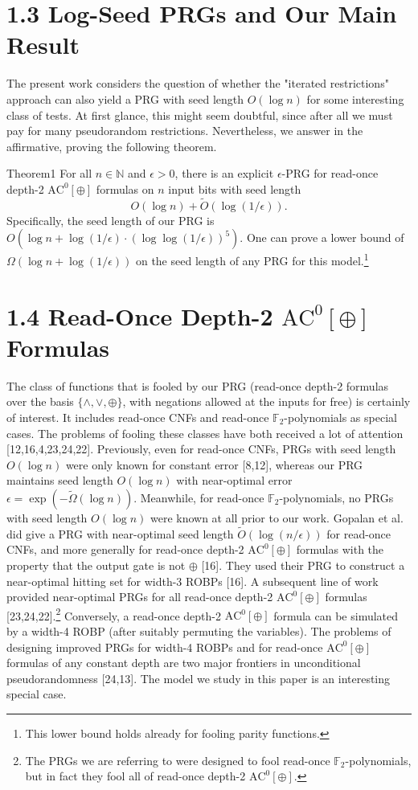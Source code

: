 \section*{1.3 Log-Seed PRGs and Our Main Result}
The present work considers the question of whether the "iterated restrictions" approach can also yield a PRG with seed length $O(\log n)$ for some interesting class of tests. At first glance, this might seem doubtful, since after all we must pay for many pseudorandom restrictions. Nevertheless, we answer in the affirmative, proving the following theorem.
\begin{authorclaim}{Theorem1}
For all $n\in\mathbb N$ and $\epsilon>0$, there is an explicit $\epsilon$-PRG for read-once depth-2 $\mathrm{AC}^0[\oplus]$ formulas on $n$ input bits with seed length
\[
O(\log n)+\widetilde O(\log(1/\epsilon)).
\]
Specifically, the seed length of our PRG is $O(\log n+\log(1/\epsilon)\cdot(\log\log(1/\epsilon))^5)$. One can prove a lower bound of $\Omega(\log n+\log(1/\epsilon))$ on the seed length of any PRG for this model.\footnote{This lower bound holds already for fooling parity functions.}
\end{authorclaim}
\section*{1.4 Read-Once Depth-2 $\mathrm{AC}^0[\oplus]$ Formulas}
The class of functions that is fooled by our PRG (read-once depth-2 formulas over the basis $\{\wedge,\vee,\oplus\}$, with negations allowed at the inputs for free) is certainly of interest. It includes read-once CNFs and read-once $\mathbb F_2$-polynomials as special cases. The problems of fooling these classes have both received a lot of attention [12,16,4,23,24,22]. Previously, even for read-once CNFs, PRGs with seed length $O(\log n)$ were only known for constant error [8,12], whereas our PRG maintains seed length $O(\log n)$ with near-optimal error $\epsilon=\exp(-\widetilde\Omega(\log n))$. Meanwhile, for read-once $\mathbb F_2$-polynomials, no PRGs with seed length $O(\log n)$ were known at all prior to our work.
Gopalan et al. did give a PRG with near-optimal seed length $\widetilde O(\log(n/\epsilon))$ for read-once CNFs, and more generally for read-once depth-2 $\mathrm{AC}^0[\oplus]$ formulas with the property that the output gate is not $\oplus$ [16]. They used their PRG to construct a near-optimal hitting set for width-3 ROBPs [16]. A subsequent line of work provided near-optimal PRGs for all read-once depth-2 $\mathrm{AC}^0[\oplus]$ formulas [23,24,22].\footnote{The PRGs we are referring to were designed to fool read-once $\mathbb F_2$-polynomials, but in fact they fool all of read-once depth-2 $\mathrm{AC}^0[\oplus]$.}
Conversely, a read-once depth-2 $\mathrm{AC}^0[\oplus]$ formula can be simulated by a width-4 ROBP (after suitably permuting the variables). The problems of designing improved PRGs for width-4 ROBPs and for read-once $\mathrm{AC}^0[\oplus]$ formulas of any constant depth are two major frontiers in unconditional pseudorandomness [24,13]. The model we study in this paper is an interesting special case.
